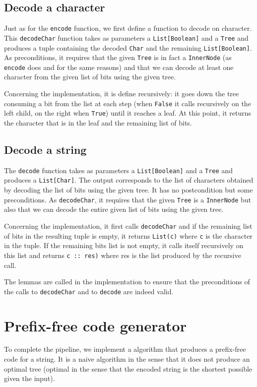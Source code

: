 \documentclass[a4paper,UKenglish,cleveref, autoref, thm-restate]{lipics-v2021}
\begin{document}
\subsection{Decode a character}
Just as for the \lstinline{encode} function, we first define a function to decode on character. This \lstinline{decodeChar} function takes as parameters a \lstinline{List[Boolean]} and 
a \lstinline{Tree} and produces a tuple containing the decoded \lstinline{Char} and the remaining \lstinline{List[Boolean]}.
As preconditions, it requires that the given \lstinline{Tree} is in fact a \lstinline{InnerNode} (as \lstinline{encode} does and for the same reasons) and that we can decode at least one character from the given list of bits using the given tree.

Concerning the implementation, it is define recursively: it goes down the tree consuming a bit from the list at each step (when \lstinline{False} it calls recursively on the left child, on the right when \lstinline{True}) until it reaches a leaf. At this point,
it returns the character that is in the leaf and the remaining list of bits.

\subsection{Decode a string}
The \lstinline{decode} function takes as parameters a \lstinline{List[Boolean]} and a \lstinline{Tree} and produces a \lstinline{List[Char]}. The output corresponds to the list of characters obtained by decoding the list of bits using the given tree.
It has no postcondition but some preconditions. As \lstinline{decodeChar}, it requires that the given \lstinline{Tree} is a \lstinline{InnerNode} but also that we can decode the entire given list of bits using the given tree.

Concerning the implementation, it first calls \lstinline{decodeChar} and if the remaining list of bits in the resulting tuple is empty, it returns \lstinline{List(c)} where \lstinline{c} is the character in the tuple. If the remaining bits list is not empty,
it calls itself recursively on this list and returns \lstinline{c :: res)} where res is the list produced by the recursive call.

The lemmas are called in the implementation to ensure that the preconditions of the calls to \lstinline{decodeChar} and to \lstinline{decode} are indeed valid.


\section{Prefix-free code generator} %
To complete the pipeline, we implement a algorithm that produces a prefix-free code for a string. It is a naive algorithm in the sense that it does not produce an optimal tree 
(optimal in the sense that the encoded string is the shortest possible given the input).
\end{document}
